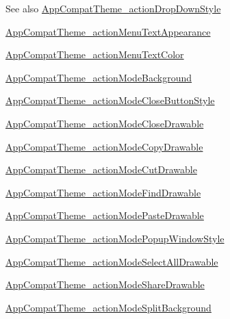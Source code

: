 \begin{DoxySeeAlso}{See also}
\hyperlink{classandroid_1_1support_1_1v4_1_1R_1_1styleable_a31fc54e0e58a5938661e66469a5a5b5f}{App\+Compat\+Theme\+\_\+action\+Drop\+Down\+Style} 

\hyperlink{classandroid_1_1support_1_1v4_1_1R_1_1styleable_a8d4a63cac0fa21d43ff5e5b99a180331}{App\+Compat\+Theme\+\_\+action\+Menu\+Text\+Appearance} 

\hyperlink{classandroid_1_1support_1_1v4_1_1R_1_1styleable_a42c5c79dac7e9099ffa7eec510614d9f}{App\+Compat\+Theme\+\_\+action\+Menu\+Text\+Color} 

\hyperlink{classandroid_1_1support_1_1v4_1_1R_1_1styleable_afefcbfb79f6f036571910bdb524294fe}{App\+Compat\+Theme\+\_\+action\+Mode\+Background} 

\hyperlink{classandroid_1_1support_1_1v4_1_1R_1_1styleable_a663f6400e9039cc3de0b0a345cc307d9}{App\+Compat\+Theme\+\_\+action\+Mode\+Close\+Button\+Style} 

\hyperlink{classandroid_1_1support_1_1v4_1_1R_1_1styleable_a235b884d67d38c23c9ce1e69aa79c7cc}{App\+Compat\+Theme\+\_\+action\+Mode\+Close\+Drawable} 

\hyperlink{classandroid_1_1support_1_1v4_1_1R_1_1styleable_a50471ef5cb2699d49ac3b144a6fbb0b4}{App\+Compat\+Theme\+\_\+action\+Mode\+Copy\+Drawable} 

\hyperlink{classandroid_1_1support_1_1v4_1_1R_1_1styleable_abe3095e21e91f61195e7e499bed38e0e}{App\+Compat\+Theme\+\_\+action\+Mode\+Cut\+Drawable} 

\hyperlink{classandroid_1_1support_1_1v4_1_1R_1_1styleable_aed5000c3e758ba19503acb4620d9059b}{App\+Compat\+Theme\+\_\+action\+Mode\+Find\+Drawable} 

\hyperlink{classandroid_1_1support_1_1v4_1_1R_1_1styleable_aa4e5a97fc5aefa3e9414a786423d1a6f}{App\+Compat\+Theme\+\_\+action\+Mode\+Paste\+Drawable} 

\hyperlink{classandroid_1_1support_1_1v4_1_1R_1_1styleable_ae15d1354af03ae1760e80c0083aed3b1}{App\+Compat\+Theme\+\_\+action\+Mode\+Popup\+Window\+Style} 

\hyperlink{classandroid_1_1support_1_1v4_1_1R_1_1styleable_a74c31f8d65fcd2a018041d8588ae4fbc}{App\+Compat\+Theme\+\_\+action\+Mode\+Select\+All\+Drawable} 

\hyperlink{classandroid_1_1support_1_1v4_1_1R_1_1styleable_a88501ea40bddb326cfe337c4c21f7488}{App\+Compat\+Theme\+\_\+action\+Mode\+Share\+Drawable} 

\hyperlink{classandroid_1_1support_1_1v4_1_1R_1_1styleable_a3a8c8ba4a4bb7a3e1cb7b23f47caa2b1}{App\+Compat\+Theme\+\_\+action\+Mode\+Split\+Background} 


\end{DoxySeeAlso}
